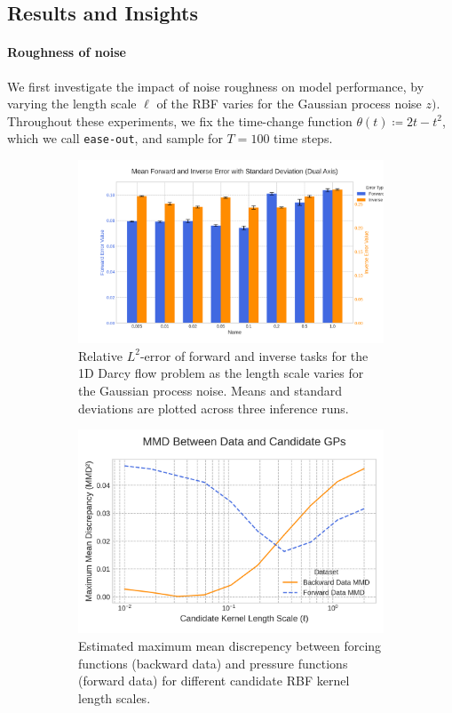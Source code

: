 \subsection{Results and Insights}
\paragraph{Roughness of noise}
We first investigate the impact of noise roughness on model performance, by varying the length scale \(\ell\) of the RBF varies for the Gaussian process noise \(z)\). Throughout these experiments, we fix the time-change function \(\theta(t) \coloneqq 2t -t^{2}\), which we call \texttt{ease-out}, and sample for \(T=100\) time steps.

\begin{figure}
\centering
\begin{subfigure}[t]{0.45\linewidth}
  \includegraphics[width=\linewidth]{len_darcy_1d.png}
  \caption{Relative \(L^{2}\)-error of forward and inverse tasks for the 1D Darcy flow problem as the length scale  varies for the Gaussian process noise. Means and standard deviations are plotted across three inference runs.}\label{fig:d1dlen}
\end{subfigure}%
\hfill%
\begin{subfigure}[t]{0.45\linewidth}
  \includegraphics[width=\linewidth]{mmd_darcy_1d.png}
  \caption{Estimated maximum mean discrepency between forcing functions (backward data) and pressure functions (forward data) for different candidate RBF kernel length scales.}\label{fig:d1dmmd}
\end{subfigure}
\caption{}
\end{figure}

